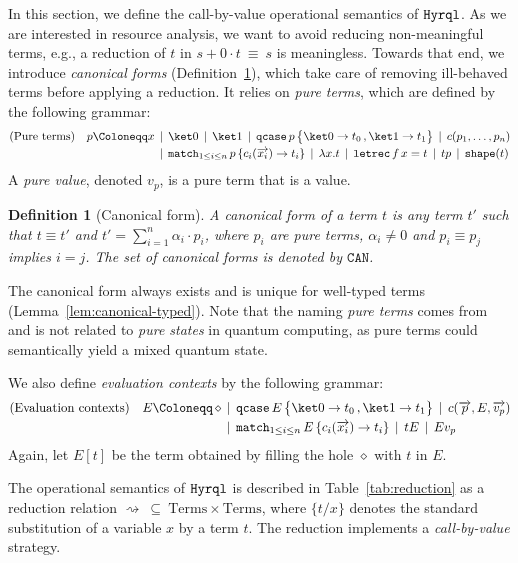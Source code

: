 \documentclass[10pt,a4paper]{article}
\newcommand{\textqcase}{\ensuremath{\mathtt{qcase}}}
\newcommand{\textmatch}{\ensuremath{\mathtt{match}}}
\newcommand{\textletrec}{\ensuremath{\mathtt{letrec}}}
\newcommand{\zket}{\ket 0}
\newcommand{\oket}{\ket 1}
\newcommand{\qcasebase}[2]{
  \textqcase\,#1\left\{\! \begin{aligned} #2 \end{aligned}\right\}
}
\newcommand{\qcase}[3]{
  \qcasebase {#1} {\zket \to #2\,, \oket \to #3}
}
\newcommand{\qcasedefault}[1]{\ensuremath{\qcase{#1}{t_0}{t_1}}}
\newcommand{\matchdefaultcollapsedany}[2]{
  \textmatch_{1 \leq i \leq n}\,#1\,\{
    c_i(\overrightarrow{x_i}) \to #2_i
  \}
}
\newcommand{\matchdefaultcollapsed}[1]{\matchdefaultcollapsedany{#1}{t}}
\newcommand{\lbd}[2]{\lambda #1 .#2}
\newcommand{\letrec}[3]{\textletrec\,#1\,#2=#3}
\newcommand{\shape}[1]{\mathtt{shape}(#1)}
\newcommand{\can}{\ensuremath{\mathtt{CAN}}}
\newcommand{\reduces}{\rightsquigarrow}
\newcommand{\evalcontext}{\ensuremath{E}}
\newcommand{\gmid}{\,\mid\,}
\newcommand{\hyrql}{{{\tt{Hyrql}}}}
\newcommand{\seq}[1]{\overrightarrow{#1}}
\newtheorem{definition}[theorem]{Definition}
\begin{document}
In this section, we define the call-by-value operational semantics of $\hyrql$.
As we are interested in resource analysis, we want to avoid reducing
non-meaningful terms, e.g., a reduction of $t$ in $s + 0 \cdot t \ \equiv\ s$
is meaningless. Towards that end, we introduce \emph{canonical forms}
(Definition~\ref{def:canonical}), which take care of removing ill-behaved terms
before applying a reduction. It relies on \emph{pure terms}, which are defined
by the following grammar:
\[
  \begin{aligned}
    (\text{Pure terms}) \quad  p  \Coloneqq x &\gmid \zket \gmid \oket
    \gmid \qcasedefault p  \gmid c(p_1, \dots, p_n) \\
    &\gmid \matchdefaultcollapsed p \gmid \lbd x t \gmid \letrec f x t
    \gmid tp \gmid \shape t
  \end{aligned}
\]
A \emph{pure value}, denoted $v_p$, is a pure term that is a value.
\begin{definition}[Canonical form]
  \label{def:canonical}
  A canonical form of a term $t$ is any term $t'$ such that
  $t\equiv t'$ and $t'=\sum_{i=1}^n \alpha_i \cdot p_i $, where $p_i$ are
  pure terms, $\alpha_i \neq 0$ and $p_i \equiv p_j$ implies  $i = j$. The
  set of canonical forms is denoted by $\can$.
\end{definition}

The canonical form always exists and is unique for well-typed terms
(Lemma~\ref{lem:canonical-typed}). Note that the naming \emph{pure terms} comes
from~\cite{DCM22} and is not related to \emph{pure states} in quantum computing,
as pure terms could semantically yield a mixed quantum state.

We also define \emph{evaluation contexts} by the following grammar:
\begin{align*}
  (\text{Evaluation contexts}) \quad \evalcontext \Coloneqq \, \diamond
  &\gmid \qcase{\evalcontext}{t_0}{t_1} \gmid c(\seq{p},
  \evalcontext, \seq{v_p}) \\
  &\gmid \matchdefaultcollapsed{\evalcontext} \gmid t \evalcontext \gmid
  \evalcontext v_p
\end{align*}
Again, let  $\evalcontext[t]$ be the term obtained by filling the
hole $\diamond$ with $t$ in $\evalcontext$.

The operational semantics of $\hyrql$ is described in Table~\ref{tab:reduction}
as a reduction relation $\reduces \ \subseteq
\ \text{Terms} \times \text{Terms}$, where $\{t/x\}$ denotes the
standard substitution of a variable $x$ by a term $t$. The reduction
implements a \emph{call-by-value} strategy.
\end{document}
